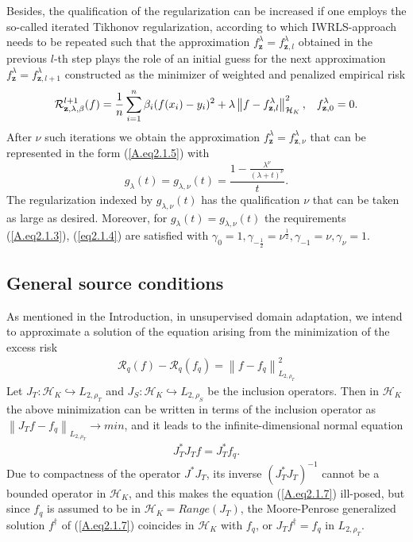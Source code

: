 \documentclass[USenglish]{article}
\newcommand{\norm}[1]{\left\lVert#1\right\rVert}
\begin{document}
Besides, the qualification of the regularization can be increased if one employs the so-called iterated Tikhonov regularization, according to which IWRLS-approach needs to be repeated such that the approximation $f_\mathbf{z}^\lambda = f_{\mathbf{z},l}^\lambda$ obtained in the previous $l$-th step plays the role of an initial guess for the next approximation $f_\mathbf{z}^\lambda = f_{\mathbf{z},l + 1}^\lambda$ constructed as the minimizer of weighted and penalized empirical risk 
\begin{align*}
\mathcal{R}_{\mathbf{z},\lambda, \beta}^{l+1} (f) = \frac{1}{n} \sum_{i = 1}^n \beta_i (f(x_i) - y_i)^2 + \lambda  \norm{f - f_{\mathbf{z},l}^\lambda}_{\mathcal{H}_K}^2, \hspace*{0.3cm} f_{\mathbf{z},0}^\lambda = 0.
\end{align*}
After $\nu$ such iterations we obtain the approximation $f_\mathbf{z}^\lambda = f_{\mathbf{z},\nu}^\lambda$ that can be represented in the form (\ref{A.eq2.1.5}) with 
$$g_\lambda (t) = g_{\lambda,\nu} (t) = \frac{1 - \frac{\lambda^\nu}{(\lambda + t)^\nu}}{t}.$$
The regularization indexed by $g_{\lambda,\nu} (t)$ has the qualification $\nu$ that can be taken as large as desired. Moreover, for $g_\lambda (t) = g_{\lambda,\nu} (t)$ the requirements (\ref{A.eq2.1.3}), (\ref{eq2.1.4}) are satisfied with $\gamma_0 = 1, \gamma_{- \frac{1}{2}} = \nu^{\frac{1}{2}}, \gamma_{-1} = \nu, \gamma_\nu = 1.$

\subsection{General source conditions}
As mentioned in the Introduction, in unsupervised domain adaptation, we intend to approximate a solution of the equation arising from the minimization of the excess risk
	\begin{align*}
	\mathcal{R}_q (f) - \mathcal{R}_q (f_q) = \norm{f - f_q}_{L_{2,\rho_T}}^2
	\end{align*}
Let $J_T: \mathcal{H}_K \hookrightarrow L_{2, \rho_T} $ and $J_S: \mathcal{H}_K \hookrightarrow L_{2, \rho_S} $ be the inclusion operators. Then in ${\mathcal{H}_K} $ the above minimization can be written in terms of the inclusion operator as $\norm{J_T f - f_q}_{L_{2,\rho_T}} \rightarrow min$, and it leads to the infinite-dimensional normal equation
	\begin{align}\label{A.eq2.1.7}
	J_T^* J_T f = J_T^* f_q.
	\end{align}
Due to compactness of the operator $J^* J_T$, its inverse $(J_T^* J_T)^{-1}$ cannot be a bounded operator in ${\mathcal{H}_K} $, and this makes the equation (\ref{A.eq2.1.7}) ill-posed, but since $f_q$ is assumed to be in ${\mathcal{H}_K}  = Range (J_T)$, the Moore-Penrose generalized solution $f^\dagger$ of (\ref{A.eq2.1.7}) coincides in ${\mathcal{H}_K}$  with $f_q$, or $J_T f^\dagger = f_q$ in $L_{2,\rho_T}.$
	
\end{document}
